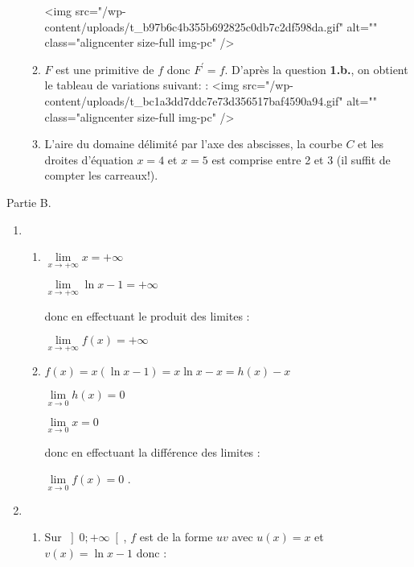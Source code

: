 \begin{corrige}
\begin{enumerate}
\begin{enumerate}
<img src="/wp-content/uploads/t_b97b6c4b355b692825c0db7c2df598da.gif" alt="" class="aligncenter size-full  img-pc" />
               \item
               $F$ est une primitive de $f$ donc $F^{\prime}=f$. D'après la question \textbf{1.b.}, on obtient le tableau de variations suivant: :
               <img src="/wp-content/uploads/t_bc1a3dd7ddc7e73d356517baf4590a94.gif" alt="" class="aligncenter size-full  img-pc" />
               \item
               L'aire du domaine délimité par l'axe des abscisses, la courbe $C$ et les droites d'équation $x=4$ et $x=5$ est comprise entre 2 et 3 (il suffit de compter les carreaux!).
          \end{enumerate}
     \end{enumerate}
     \begin{h3}Partie B.\end{h3}
     \begin{enumerate}
          \item
          \begin{enumerate}[label=\alph*.]
               \item
               $\lim\limits_{x\rightarrow +\infty }x=+\infty $
               \par
               $\lim\limits_{x\rightarrow +\infty }\ln x-1=+\infty $
               \par
               donc en effectuant le produit des limites :
               \par
               $\lim\limits_{x\rightarrow +\infty }f\left(x\right)=+\infty $
               \item
               $f\left(x\right)=x\left(\ln x-1\right)=x\ln x-x=h\left(x\right)-x$
               \par
               $\lim\limits_{x\rightarrow 0}h\left(x\right)=0$
               \par
               $\lim\limits_{x\rightarrow 0}x=0$
               \par
               donc en effectuant la différence des limites :
               \par
               $\lim\limits_{x\rightarrow 0}f\left(x\right)=0$
               .
          \end{enumerate}
          \item
          \begin{enumerate}[label=\alph*.]
               \item
               Sur $\left]0; +\infty \right[$, $f$ est de la forme $uv$ avec $u\left(x\right)=x$ et $v\left(x\right)=\ln x-1$ donc :

\end{enumerate}
\end{enumerate}
\end{corrige}
